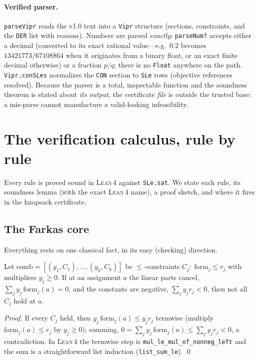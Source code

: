 \documentclass[runningheads]{llncs}
\newcommand{\code}[1]{\texttt{#1}}
\newcommand{\lean}{\textsc{Lean\,4}}
\begin{document}
\paragraph{Verified parser.} \code{parseVipr} reads the v1.0 text into a \code{Vipr}
structure (sections, constraints, and the \code{DER} list with reasons). Numbers are
parsed \emph{exactly}: \code{parseNum?} accepts either a decimal (converted to its exact
rational value---e.g.\ $0.2$ becomes $13421773/67108864$ when it originates from a
binary float, or an exact finite decimal otherwise) or a fraction $p/q$; there is no
\code{Float} anywhere on the path. \code{Vipr.conSLes} normalizes the \code{CON} section
to \code{SLe} rows (objective references resolved). Because the parser is a total,
inspectable function and the soundness theorem is stated about \emph{its output}, the
certificate \emph{file} is outside the trusted base: a mis-parse cannot manufacture a
valid-looking infeasibility.

\section{The verification calculus, rule by rule}\label{sec:calculus}

Every rule is proved sound in \lean{} against \code{SLe.sat}. We state each rule, its
soundness lemma (with the exact \lean{} name), a proof sketch, and where it fires in the
knapsack certificate.

\subsection{The Farkas core}\label{sec:calc-farkas}
Everything rests on one classical fact, in its easy (checking) direction.

\begin{lemma}[\code{farkas\_le}]\label{lem:farkas}
Let $\mathrm{comb}=[(y_1,C_1),\dots,(y_k,C_k)]$ be $\le$-constraints $C_j:\
\mathrm{form}_j\le r_j$ with multipliers $y_j\ge0$. If at an assignment $a$ the linear
parts cancel, $\sum_j y_j\,\mathrm{form}_j(a)=0$, and the constants are negative,
$\sum_j y_j r_j<0$, then not all $C_j$ hold at $a$.
\end{lemma}
\begin{proof}
If every $C_j$ held, then $y_j\,\mathrm{form}_j(a)\le y_j r_j$ termwise (multiply
$\mathrm{form}_j(a)\le r_j$ by $y_j\ge0$); summing, $0=\sum_j y_j\,\mathrm{form}_j(a)\le
\sum_j y_j r_j<0$, a contradiction. In \lean{} the termwise step is
\code{mul\_le\_mul\_of\_nonneg\_left} and the sum is a straightforward list induction
(\code{list\_sum\_le}). \qed
\end{proof}
\end{document}

